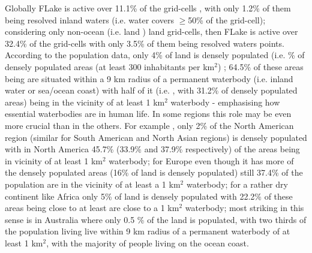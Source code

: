 \documentclass[hess, twostagejnl]{copernicus}
\providecommand{\DIFadd}[1]{{\protect\color{blue} \sf #1}} %
\providecommand{\DIFdel}[1]{{\protect\color{red} \scriptsize #1}} %
\providecommand{\DIFaddbegin}{} %
\providecommand{\DIFaddend}{} %
\providecommand{\DIFdelbegin}{} %
\providecommand{\DIFdelend}{} %
\begin{document}
\DIFaddend Globally FLake is active over 11.1\% of the grid-cells\DIFdelbegin \DIFdel{, with only 1.2\% of them being resolved inland waters (i.e. water covers $\geq$50\% of the grid-cell)}\DIFdelend ; considering only \DIFdelbegin \DIFdel{non-ocean (i.e. land ) }\DIFdelend \DIFaddbegin \DIFadd{land }\DIFaddend grid-cells, then FLake is active over 32.4\% of the \DIFdelbegin \DIFdel{grid-cells with only 3.5\% of them being resolved waters}\DIFdelend \DIFaddbegin \DIFadd{points}\DIFaddend . According to the population data, \DIFdelbegin \DIFdel{only 4\% of land is densely populated (i.e. }\DIFdelend \DIFaddbegin \DIFadd{64.5\% of densely populated areas (}\DIFaddend at least 300 inhabitants per km$^2$) \DIFdelbegin \DIFdel{; 64.5\% of these areas being }\DIFdelend \DIFaddbegin \DIFadd{are }\DIFaddend situated within a 9 km radius of a permanent waterbody (i.e. inland water or sea/ocean coast)\DIFdelbegin \DIFdel{with half of it (i.e. }\DIFdelend \DIFaddbegin \DIFadd{, with }\DIFaddend 31.2\% \DIFdelbegin \DIFdel{of densely populated areas) }\DIFdelend being in the vicinity of at least 1 km$^2$ waterbody - emphasising how essential waterbodies are in human life. In some regions this role may be even more crucial than in the others. For example \DIFdelbegin \DIFdel{, only 2\% of the North American region (similar for South American and North Asian regions) is densely populated with }\DIFdelend \DIFaddbegin \DIFadd{in North America }\DIFaddend 45.7\% \DIFdelbegin \DIFdel{(33.9\% and 37.9\% respectively) of the areas being in vicinity of at least 1 km$^2$ waterbody; for Europe even though it has more }\DIFdelend \DIFaddbegin \DIFadd{of the }\DIFaddend densely populated areas \DIFdelbegin \DIFdel{(16\% of land is densely populated) still 37.4\% of the population are in the vicinity of at least a 1 km$^2$ waterbody; for a rather dry continent like Africa only 5\% of land is densely populated with 22.2\% of these areas being close to at least }\DIFdelend \DIFaddbegin \DIFadd{are close to }\DIFaddend a 1 km$^2$ waterbody; \DIFdelbegin \DIFdel{most striking in this sense is }\DIFdelend \DIFaddbegin \DIFadd{in }\DIFaddend Australia where only 0.5 \% of the land is populated,  \DIFdelbegin \DIFdel{with }\DIFdelend two thirds of the population \DIFdelbegin \DIFdel{living }\DIFdelend \DIFaddbegin \DIFadd{live }\DIFaddend within 9 km radius of a permanent waterbody of at least 1 km$^2$, with the majority of people living on the ocean coast. \newline 
\end{document}
